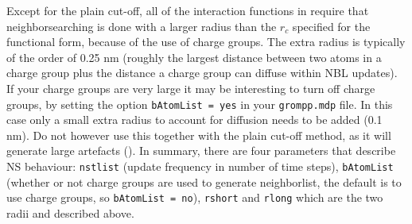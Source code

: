 Except for the plain cut-off,
all of the interaction functions in 
require that neighborsearching is done with a larger radius than the $r_c$
specified for the functional form, because of the use of charge groups.
The extra radius is typically of the order of 0.25 nm (roughly the 
largest distance between two atoms in a charge group plus the distance a 
charge group can diffuse within NBL updates).
If your charge groups are very large it may be interesting to turn off charge
groups, by setting the option 
{\tt bAtomList = yes} in your {\tt grompp.mdp} file.
In this case only a small extra radius to account for diffusion needs to be 
added (0.1 nm). Do not however use this together with the plain cut-off
method, as it will generate large artefacts ().
In summary, there are four parameters that describe NS behaviour:
{\tt nstlist} (update frequency in number of time steps),
{\tt bAtomList} (whether or not charge groups are used to generate neighborlist, the default is to use charge groups, so {\tt bAtomList = no}),
{\tt rshort} and {\tt rlong} which are the two radii {\rs} and {\rl}
described above.

